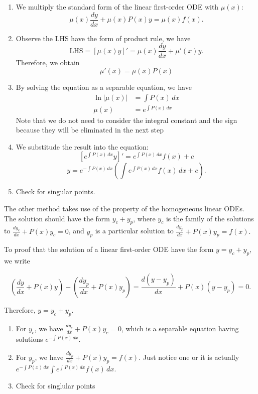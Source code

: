 \documentclass[12pt,a4paper]{report}
\theoremstyle{definition}
\theoremstyle{remark}
\begin{document}
\begin{enumerate}
    \item We multiply the standard form of the linear first-order ODE with $\mu(x)$:
    \[\mu(x)\frac{dy}{dx} + \mu(x)P(x)y = \mu(x)f(x).\]
    \item Observe the LHS have the form of product rule, we have
    \[\text{LHS} = \left[\mu(x)y\right]' = \mu(x)\frac{dy}{dx} + \mu'(x)y.\]
    Therefore, we obtain
    \[\mu'(x) = \mu(x) P(x)\]
    \item 
    By solving the equation as a separable equation, we have 
    \begin{align*}
        \ln|\mu(x)| &= \int P(x) \, dx\\
        \mu(x) &= e^{\int P(x) \, dx}
    \end{align*}
    Note that we do not need to consider the integral constant and the sign because they will be eliminated in the next step
    \item We substitude the result into the equation:
    \[[e^{\int P(x) \, dx} y]' = e^{\int P(x) \, dx}f(x) + c\]
    \[y = e^{-\int P(x) \, dx} \left(\int{e^{\int P(x) \, dx}f(x) \, dx} + c\right).\]
    \item Check for singular points.
\end{enumerate}

The other method takes use of the property of the homogeneous linear ODEs. The solution should have the form $y_c + y_p$, where $y_c$ is the family of the solutions to $\displaystyle\frac{dy_c}{dx} + P(x)y_c = 0$, and $y_p$ is a particular solution to $\displaystyle\frac{dy_p}{dx} + P(x)y_p = f(x).$

To proof that the solution of a linear first-order ODE have the form $y = y_c + y_p,$ we write

\[(\frac{dy}{dx} + P(x)y) - (\frac{dy_p}{dx} + P(x)y_p) = \frac{d(y - y_p)}{dx} + P(x)(y - y_p) = 0.\]

\noindent Therefore, $y = y_c + y_p.$

\begin{enumerate}
    \item For $y_c$, we have $\displaystyle\frac{dy_c}{dx} + P(x)y_c = 0$, which is a separable equation having solutions $e^{-\int P(x) \, dx}.$
    \item For $y_p$, we have $\displaystyle\frac{dy_p}{dx} + P(x)y_p = f(x).$ Just notice one or it is actually $e^{-\int P(x) \, dx} \displaystyle\int{e^{\int P(x) \, dx}f(x) \, dx}$.
    \item Check for singlular points
\end{enumerate}
\end{document}
